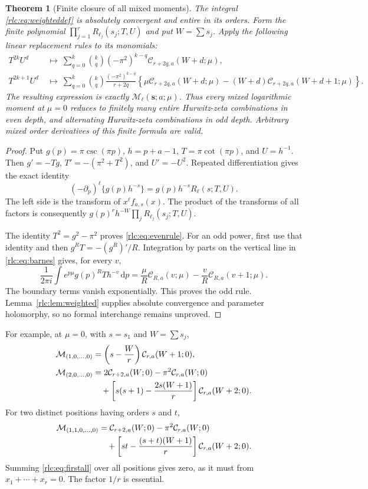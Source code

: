 \documentclass[11pt,a4paper]{article}
\numberwithin{equation}{section}
\newtheorem{theorem}{Theorem}[section]
\theoremstyle{definition}\newtheorem{definition}[theorem]{Definition}
\theoremstyle{remark}\newtheorem{remark}[theorem]{Remark}
\newcommand{\dd}{\,\mathrm d}
\newcommand{\CC}{\mathcal C}
\newcommand{\MM}{\mathcal M}
\begin{document}
\begin{theorem}[Finite closure of all mixed moments]
\label{rlc:thm:allmoments}
The integral \eqref{rlc:eq:weighteddef} is absolutely convergent and
entire in its orders. Form the finite polynomial
$\prod_{j=1}^r R_{\ell_j}(s_j;T,U)$ and put $W=\sum s_j$.
Apply the following linear replacement rules to its monomials:
\begin{align}
 T^{2k}U^d\ &\longmapsto\
 \sum_{q=0}^k\binom{k}{q}(-\pi^2)^{k-q}
        \CC_{r+2q,a}(W+d;\mu),\label{rlc:eq:evenrule}\\
 T^{2k+1}U^d\ &\longmapsto\
 \sum_{q=0}^k\binom{k}{q}\frac{(-\pi^2)^{k-q}}{r+2q}
 \left\{\mu\CC_{r+2q,a}(W+d;\mu)
 -(W+d)\CC_{r+2q,a}(W+d+1;\mu)\right\}.
 \label{rlc:eq:oddrule}
\end{align}
The resulting expression is exactly
$\MM_{\boldsymbol\ell}(\boldsymbol s;a;\mu)$.
Thus every mixed logarithmic moment at $\mu=0$ reduces to finitely many
entire Hurwitz-zeta combinations in even depth, and alternating
Hurwitz-zeta combinations in odd depth. Arbitrary mixed order
derivatives of this finite formula are valid.
\end{theorem}
\begin{proof}
Put $g(p)=\pi\csc(\pi p)$, $h=p+a-1$, $T=\pi\cot(\pi p)$,
and $U=h^{-1}$. Then
$g'=-Tg$, $T'=-(\pi^2+T^2)$, and $U'=-U^2$.
Repeated differentiation gives the exact identity
\[
 (-\partial_p)^\ell\{g(p)h^{-s}\}
       =g(p)h^{-s}R_\ell(s;T,U).
\]
The left side is the transform of $x^\ell f_{a,s}(x)$.
The product of the transforms of all factors is consequently
$g(p)^r h^{-W}\prod_jR_{\ell_j}(s_j;T,U)$.

The identity $T^2=g^2-\pi^2$ proves
\eqref{rlc:eq:evenrule}. For an odd power, first use that identity
and then $g^R T=-(g^R)'/R$. Integration by parts on the vertical line
in \eqref{rlc:eq:barnes} gives, for every $v$,
\[
 \frac1{2\pi i}\int e^{p\mu}g(p)^R T h^{-v}\dd p
 =\frac{\mu}{R}\CC_{R,a}(v;\mu)
       -\frac{v}{R}\CC_{R,a}(v+1;\mu).
\]
The boundary terms vanish exponentially. This proves the odd rule.
Lemma~\ref{rlc:lem:weighted} supplies absolute convergence and parameter
holomorphy, so no formal interchange remains unproved.
\end{proof}

For example, at $\mu=0$, with $s=s_1$ and $W=\sum s_j$,
\begin{align}
 \MM_{(1,0,\ldots,0)}
 &=\left(s-\frac Wr\right)\CC_{r,a}(W+1;0),
 \label{rlc:eq:firstall}\\
 \MM_{(2,0,\ldots,0)}
 &=2\CC_{r+2,a}(W;0)-\pi^2\CC_{r,a}(W;0)\notag\\
 &\quad+\left[s(s+1)-\frac{2s(W+1)}r\right]
                \CC_{r,a}(W+2;0).
 \label{rlc:eq:secondall}
\end{align}
For two distinct positions having orders $s$ and $t$,
\begin{align}
 \MM_{(1,1,0,\ldots,0)}
 &=\CC_{r+2,a}(W;0)-\pi^2\CC_{r,a}(W;0)\notag\\
 &\quad+\left[st-\frac{(s+t)(W+1)}r\right]
                    \CC_{r,a}(W+2;0).
 \label{rlc:eq:mixedsecond}
\end{align}
Summing \eqref{rlc:eq:firstall} over all positions gives zero, as it
must from $x_1+\cdots+x_r=0$. The factor $1/r$ is essential.
\end{document}
